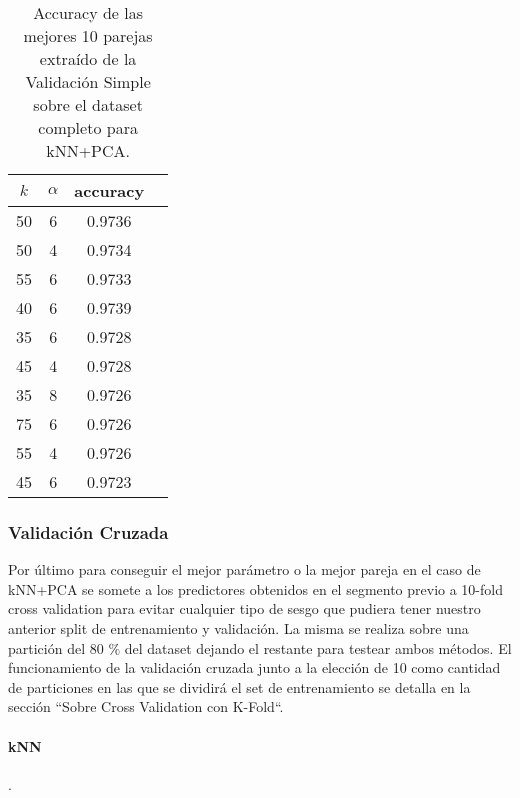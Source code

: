 \begin{table}[h!]
    \begin{center}
        \begin{tabular}{|c|c|c|c|}
        \hline
        \textbf{$k$} & \textbf{$\alpha$} & \textbf{accuracy} \\
        \hline
        50 & 6 & 0.9736\\
        50 & 4 & 0.9734\\
        55 & 6 & 0.9733\\
        40 & 6 & 0.9739\\
        35 & 6 & 0.9728\\
        45 & 4 & 0.9728\\
        35 & 8 & 0.9726\\
        75 & 6 & 0.9726\\
        55 & 4 & 0.9726\\
        45 & 6 & 0.9723\\
        
        \hline
        \end{tabular}
        \caption{Accuracy de las mejores 10 parejas extraído de la Validación Simple sobre el dataset completo para kNN+PCA.}
        \label{knnpca_valSimple_table}
    \end{center}
\end{table}

\subsubsection{Validación Cruzada}

Por último para conseguir el mejor parámetro o la mejor pareja en el caso de kNN+PCA se somete a los predictores obtenidos en el segmento previo a 10-fold cross
validation para evitar cualquier tipo de sesgo que pudiera tener nuestro anterior split de entrenamiento y validación. La misma se realiza sobre una partición del 80 $\%$ del dataset dejando el restante para testear ambos métodos.
El funcionamiento de la validación cruzada junto a la elección de 10 como cantidad de particiones en las que se dividirá el set de entrenamiento se detalla en la sección ``Sobre Cross Validation con K-Fold``.

\paragraph{kNN}.

